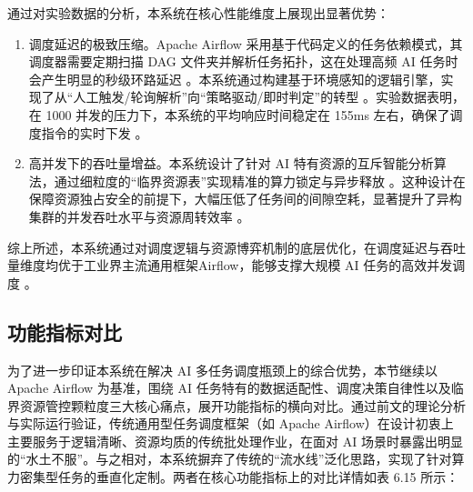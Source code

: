 通过对实验数据的分析，本系统在核心性能维度上展现出显著优势：

\begin{enumerate}
    \item 调度延迟的极致压缩。Apache Airflow 采用基于代码定义的任务依赖模式，其调度器需要定期扫描 DAG 文件夹并解析任务拓扑，这在处理高频 AI 任务时会产生明显的秒级环路延迟 。本系统通过构建基于环境感知的逻辑引擎，实现了从“人工触发/轮询解析”向“策略驱动/即时判定”的转型 。实验数据表明，在 1000 并发的压力下，本系统的平均响应时间稳定在 155ms 左右，确保了调度指令的实时下发 。
    \item 高并发下的吞吐量增益。本系统设计了针对 AI 特有资源的互斥智能分析算法，通过细粒度的“临界资源表”实现精准的算力锁定与异步释放 。这种设计在保障资源独占安全的前提下，大幅压低了任务间的间隙空耗，显著提升了异构集群的并发吞吐水平与资源周转效率 。
\end{enumerate}

综上所述，本系统通过对调度逻辑与资源博弈机制的底层优化，在调度延迟与吞吐量维度均优于工业界主流通用框架Airflow，能够支撑大规模 AI 任务的高效并发调度 。

\subsection{功能指标对比}

为了进一步印证本系统在解决 AI 多任务调度瓶颈上的综合优势，本节继续以 Apache Airflow 为基准，围绕 AI 任务特有的数据适配性、调度决策自律性以及临界资源管控颗粒度三大核心痛点，展开功能指标的横向对比。通过前文的理论分析与实际运行验证，传统通用型任务调度框架（如 Apache Airflow）在设计初衷上主要服务于逻辑清晰、资源均质的传统批处理作业，在面对 AI 场景时暴露出明显的“水土不服”。与之相对，本系统摒弃了传统的“流水线”泛化思路，实现了针对算力密集型任务的垂直化定制。两者在核心功能指标上的对比详情如表 6.15 所示：

